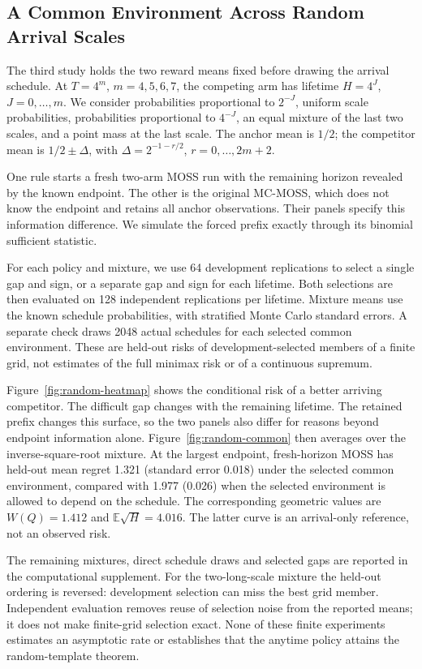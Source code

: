 \subsection{A Common Environment Across Random Arrival Scales}\label{sec:experiment-random}
The third study holds the two reward means fixed before drawing the
arrival schedule. At $T=4^m$, $m=4,5,6,7$, the competing arm has lifetime
$H=4^J$, $J=0,\ldots,m$. We consider probabilities proportional to
$2^{-J}$, uniform scale probabilities, probabilities proportional to
$4^{-J}$, an equal mixture of the last two scales, and a point mass at
the last scale. The anchor mean is $1/2$; the competitor mean is
$1/2\pm\Delta$, with $\Delta=2^{-1-r/2}$, $r=0,\ldots,2m+2$.

One rule starts a fresh two-arm MOSS run with the remaining horizon
revealed by the known endpoint. The other is the original MC-MOSS,
which does not know the endpoint and retains all anchor observations.
Their panels specify this information difference. We simulate the
forced prefix exactly through its binomial sufficient statistic.

For each policy and mixture, we use 64 development replications to
select a single gap and sign, or a separate gap and sign for each lifetime.
Both selections are then evaluated on 128 independent replications per
lifetime. Mixture means use the known schedule probabilities, with
stratified Monte Carlo standard errors. A separate check draws 2048
actual schedules for each selected common environment. These are
held-out risks of development-selected members of a finite grid, not
estimates of the full minimax risk or of a continuous supremum.

Figure~\ref{fig:random-heatmap} shows the conditional risk of a better
arriving competitor. The difficult gap changes with the remaining
lifetime. The retained prefix changes this surface, so the two panels
also differ for reasons beyond endpoint information alone.
Figure~\ref{fig:random-common} then averages over the inverse-square-root
mixture. At the largest endpoint, fresh-horizon MOSS has held-out mean
regret 1.321 (standard error 0.018) under the selected common
environment, compared with 1.977 (0.026) when the selected
environment is allowed to depend on the schedule. The corresponding
geometric values are $W(Q)=1.412$ and $\mathbb E\sqrt H=4.016$.
The latter curve is an arrival-only reference, not an observed risk.

The remaining mixtures, direct schedule draws and selected gaps are
reported in the computational supplement. For the two-long-scale
mixture the held-out ordering is reversed: development selection can
miss the best grid member. Independent evaluation removes reuse of
selection noise from the reported means; it does not make finite-grid
selection exact. None of these finite experiments estimates an
asymptotic rate or establishes that the anytime policy attains the
random-template theorem.


